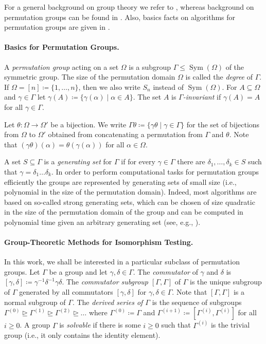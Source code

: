 \documentclass{theoretics}
\DeclareMathOperator{\Sym}{Sym}
\begin{document}
For a general background on group theory we refer to \cite{Rotman99}, whereas background on permutation groups can be found in \cite{DixonM96}.
Also, basics facts on algorithms for permutation groups are given in \cite{Seress03}.

\paragraph{Basics for Permutation Groups.}

A \emph{permutation group} acting on a set $\Omega$ is a subgroup $\Gamma \leq \Sym(\Omega)$ of the symmetric group.
The size of the permutation domain $\Omega$ is called the \emph{degree} of $\Gamma$.
If $\Omega = [n] \coloneqq \{1,\dots,n\}$, then we also write $S_n$ instead of $\Sym(\Omega)$.
For $A \subseteq \Omega$ and $\gamma \in \Gamma$ let $\gamma(A) \coloneqq \{\gamma(\alpha) \mid \alpha \in A\}$.
The set $A$ is \emph{$\Gamma$-invariant} if $\gamma(A) = A$ for all $\gamma \in \Gamma$.

Let $\theta\colon \Omega \rightarrow \Omega'$ be a bijection.
We write $\Gamma\theta \coloneqq \{\gamma\theta \mid \gamma \in \Gamma\}$ for the set of bijections from $\Omega$ to $\Omega'$ obtained from concatenating a permutation from $\Gamma$ and $\theta$.
Note that $(\gamma\theta)(\alpha) = \theta(\gamma(\alpha))$ for all $\alpha \in \Omega$.

A set $S \subseteq \Gamma$ is a \emph{generating set} for $\Gamma$ if for every $\gamma \in \Gamma$ there are $\delta_1,\dots,\delta_k \in S$ such that $\gamma = \delta_1 \dots \delta_k$.
In order to perform computational tasks for permutation groups efficiently the groups are represented by generating sets of small size (i.e., polynomial in the size of the permutation domain).
Indeed, most algorithms are based on so-called strong generating sets,
which can be chosen of size quadratic in the size of the permutation domain of the group and can be computed in polynomial time given an arbitrary generating set (see, e.g., \cite{Seress03}).

\paragraph{Group-Theoretic Methods for Isomorphism Testing.}

In this work, we shall be interested in a particular subclass of permutation groups.
Let $\Gamma$ be a group and let $\gamma,\delta \in \Gamma$.
The \emph{commutator} of $\gamma$ and $\delta$ is $[\gamma,\delta] \coloneqq \gamma^{-1}\delta^{-1}\gamma\delta$.
The \emph{commutator subgroup $[\Gamma,\Gamma]$} of $\Gamma$ is the unique subgroup of $\Gamma$ generated by all commutators $[\gamma,\delta]$ for $\gamma,\delta \in \Gamma$.
Note that $[\Gamma,\Gamma]$ is a normal subgroup of $\Gamma$.
The \emph{derived series of $\Gamma$} is the sequence of subgroups $\Gamma^{(0)} \trianglerighteq \Gamma^{(1)} \trianglerighteq \Gamma^{(2)} \trianglerighteq \dots$ where $\Gamma^{(0)} \coloneqq \Gamma$ and $\Gamma^{(i+1)} \coloneqq [\Gamma^{(i)},\Gamma^{(i)}]$ for all $i \geq 0$.
A group $\Gamma$ is \emph{solvable} if there is some $i \geq 0$ such that $\Gamma^{(i)}$ is the trivial group (i.e., it only contains the identity element).
\end{document}

